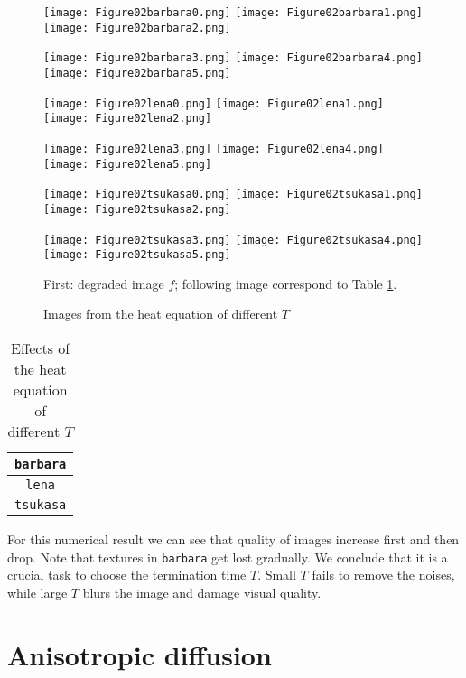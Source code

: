 \documentclass[english, nochinese]{pnote}
\begin{document}
\begin{figure}[htb]
{
\centering

\texttt{[image: Figure02barbara0.png]}
\texttt{[image: Figure02barbara1.png]}
\texttt{[image: Figure02barbara2.png]}

\texttt{[image: Figure02barbara3.png]}
\texttt{[image: Figure02barbara4.png]}
\texttt{[image: Figure02barbara5.png]}

\texttt{[image: Figure02lena0.png]}
\texttt{[image: Figure02lena1.png]}
\texttt{[image: Figure02lena2.png]}

\texttt{[image: Figure02lena3.png]}
\texttt{[image: Figure02lena4.png]}
\texttt{[image: Figure02lena5.png]}

\texttt{[image: Figure02tsukasa0.png]}
\texttt{[image: Figure02tsukasa1.png]}
\texttt{[image: Figure02tsukasa2.png]}

\texttt{[image: Figure02tsukasa3.png]}
\texttt{[image: Figure02tsukasa4.png]}
\texttt{[image: Figure02tsukasa5.png]}

\caption{Images from the heat equation of different $T$}
\label{Fig:HeatDyn}
}
{
\footnotesize First: degraded image $f$; following image correspond to Table \ref{Tbl:HeatDyn}.
}
\end{figure}

\begin{table}[htb]
\centering
\begin{tabular}{|c|c|c|c|c|c|c|}
\hline
\multicolumn{7}{|c|}{\texttt{barbara}} \\
\hline

\multicolumn{7}{|c|}{\texttt{lena}} \\
\hline

\multicolumn{7}{|c|}{\texttt{tsukasa}} \\
\hline

\end{tabular}
\caption{Effects of the heat equation of different $T$}
\label{Tbl:HeatDyn}
\end{table}

For this numerical result we can see that quality of images increase first and then drop. Note that textures in \verb"barbara" get lost gradually. We conclude that it is a crucial task to choose the termination time $T$. Small $T$ fails to remove the noises, while large $T$ blurs the image and damage visual quality.

\section{Anisotropic diffusion}
\end{document}
